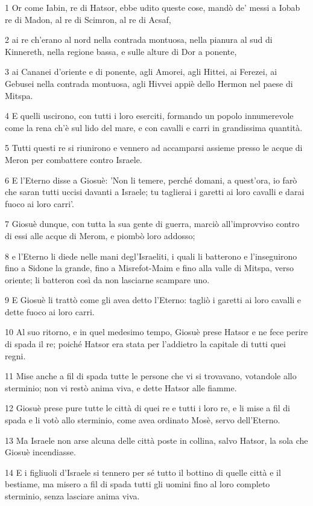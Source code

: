 \par 1 Or come Iabin, re di Hatsor, ebbe udito queste cose, mandò de' messi a Iobab re di Madon, al re di Scimron, al re di Acsaf,
\par 2 ai re ch'erano al nord nella contrada montuosa, nella pianura al sud di Kinnereth, nella regione bassa, e sulle alture di Dor a ponente,
\par 3 ai Cananei d'oriente e di ponente, agli Amorei, agli Hittei, ai Ferezei, ai Gebusei nella contrada montuosa, agli Hivvei appiè dello Hermon nel paese di Mitspa.
\par 4 E quelli uscirono, con tutti i loro eserciti, formando un popolo innumerevole come la rena ch'è sul lido del mare, e con cavalli e carri in grandissima quantità.
\par 5 Tutti questi re si riunirono e vennero ad accamparsi assieme presso le acque di Meron per combattere contro Israele.
\par 6 E l'Eterno disse a Giosuè: 'Non li temere, perché domani, a quest'ora, io farò che saran tutti uccisi davanti a Israele; tu taglierai i garetti ai loro cavalli e darai fuoco ai loro carri'.
\par 7 Giosuè dunque, con tutta la sua gente di guerra, marciò all'improvviso contro di essi alle acque di Merom, e piombò loro addosso;
\par 8 e l'Eterno li diede nelle mani degl'Israeliti, i quali li batterono e l'inseguirono fino a Sidone la grande, fino a Misrefot-Maim e fino alla valle di Mitspa, verso oriente; li batteron così da non lasciarne scampare uno.
\par 9 E Giosuè li trattò come gli avea detto l'Eterno: tagliò i garetti ai loro cavalli e dette fuoco ai loro carri.
\par 10 Al suo ritorno, e in quel medesimo tempo, Giosuè prese Hatsor e ne fece perire di spada il re; poiché Hatsor era stata per l'addietro la capitale di tutti quei regni.
\par 11 Mise anche a fil di spada tutte le persone che vi si trovavano, votandole allo sterminio; non vi restò anima viva, e dette Hatsor alle fiamme.
\par 12 Giosuè prese pure tutte le città di quei re e tutti i loro re, e li mise a fil di spada e li votò allo sterminio, come avea ordinato Mosè, servo dell'Eterno.
\par 13 Ma Israele non arse alcuna delle città poste in collina, salvo Hatsor, la sola che Giosuè incendiasse.
\par 14 E i figliuoli d'Israele si tennero per sé tutto il bottino di quelle città e il bestiame, ma misero a fil di spada tutti gli uomini fino al loro completo sterminio, senza lasciare anima viva.
